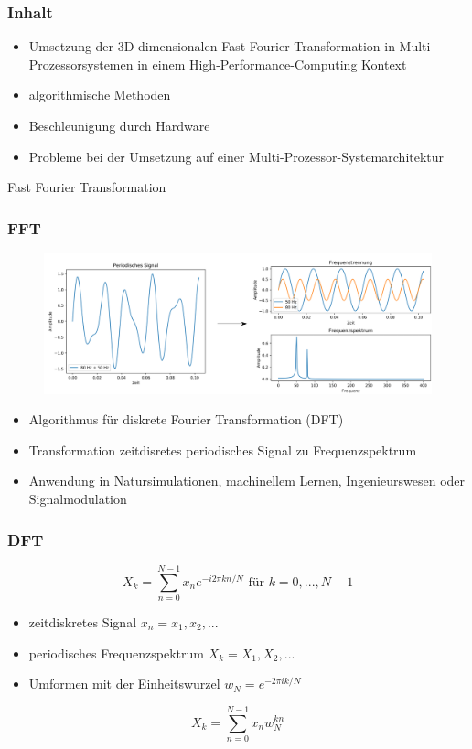 \frame
{	\frametitle{Inhalt}
	\begin{itemize}
		\item Umsetzung der 3D-dimensionalen Fast-Fourier-Transformation in Multi-Prozessorsystemen in einem High-Performance-Computing Kontext
		\item algorithmische Methoden
		\item Beschleunigung durch Hardware
		\item Probleme bei der Umsetzung auf einer Multi-Prozessor-Systemarchitektur
	\end{itemize}
}

\frame
{
	\begin{center}
		\Large Fast Fourier Transformation \normalsize
	\end{center}
}

\frame
{
	\frametitle{FFT}
	\begin{figure}[h!]
		\centering
		\includegraphics[width=\linewidth, keepaspectratio]{../Pictures/Fourierreihe.png}
	\end{figure}
	\begin{itemize}
		\item Algorithmus für diskrete Fourier Transformation (DFT)
		\item Transformation zeitdisretes periodisches Signal zu Frequenzspektrum 
		\item Anwendung in Natursimulationen, machinellem Lernen, Ingenieurswesen oder Signalmodulation
	\end{itemize}
}

\frame
{
	\frametitle{DFT}
	\begin{equation*}
		X_{k}= \sum_{n=0}^{N-1} x_{n} e^{-i2 \pi kn /N} \text{  für } k=0,...,N-1
	\label{eq:DFT}
	\end{equation*}
	\begin{itemize}
		\item zeitdiskretes Signal $x_{n} = x_{1}, x_{2},...$
		\item periodisches Frequenzspektrum $X_{k} = X_{1}, X_{2},...$
		\item Umformen mit der Einheitswurzel $w_{N} = e^{-2 \pi ik /N}$
	\end{itemize}
	
	\begin{equation*}
		X_{k}= \sum_{n=0}^{N-1} x_{n} w_{N}^{kn}
	\end{equation*}
}

